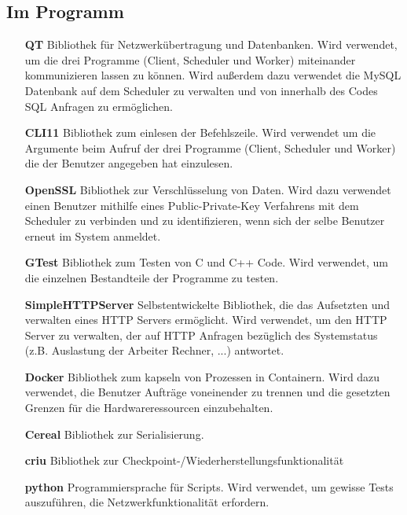 \documentclass[a4paper,12pt]{article}
\begin{document}
\subsection{Im Programm}
\begin{itemize}
	\item [\textbf{QT}] \hspace{10mm} Bibliothek für Netzwerkübertragung und Datenbanken. Wird verwendet, um die drei Programme (Client, Scheduler und Worker) miteinander kommunizieren lassen zu können. Wird außerdem dazu verwendet die MySQL Datenbank auf dem Scheduler zu verwalten und von innerhalb des Codes SQL Anfragen zu ermöglichen.

	\item [\textbf{CLI11}]\hspace{10mm} Bibliothek zum einlesen der Befehlszeile. Wird verwendet um die Argumente beim Aufruf der drei Programme (Client, Scheduler und Worker) die der Benutzer angegeben hat einzulesen.

	\item [\textbf{OpenSSL}] \hspace{10mm} Bibliothek zur Verschlüsselung von Daten. Wird dazu verwendet einen Benutzer mithilfe eines Public-Private-Key Verfahrens mit dem Scheduler zu verbinden und zu identifizieren, wenn sich der selbe Benutzer erneut im System anmeldet.

	\item [\textbf{GTest}] \hspace{0.5cm} Bibliothek zum Testen von C und C++ Code. Wird verwendet, um die einzelnen Bestandteile der Programme zu testen.

	\item [\textbf{SimpleHTTPServer}] \hspace{3cm} Selbstentwickelte Bibliothek, die das Aufsetzten und verwalten eines HTTP Servers ermöglicht. Wird verwendet, um den HTTP Server zu verwalten, der auf HTTP Anfragen bezüglich des Systemstatus (z.B. Auslastung der Arbeiter Rechner, ...) antwortet.

	\item [\textbf{Docker}]\hspace{10mm} Bibliothek zum kapseln von Prozessen in Containern. Wird dazu verwendet, die Benutzer Aufträge voneinender zu trennen und die gesetzten Grenzen für die Hardwareressourcen einzubehalten.

	\item [\textbf{Cereal}]\hspace{1cm} Bibliothek zur Serialisierung.

	\item [\textbf{criu}] \hspace{1cm}Bibliothek zur Checkpoint-/Wiederherstellungsfunktionalität 

	\item [\textbf{python}]\hspace{1cm} Programmiersprache für Scripts. Wird verwendet, um gewisse Tests auszuführen, die Netzwerkfunktionalität erfordern.

\end{itemize}
\end{document}
